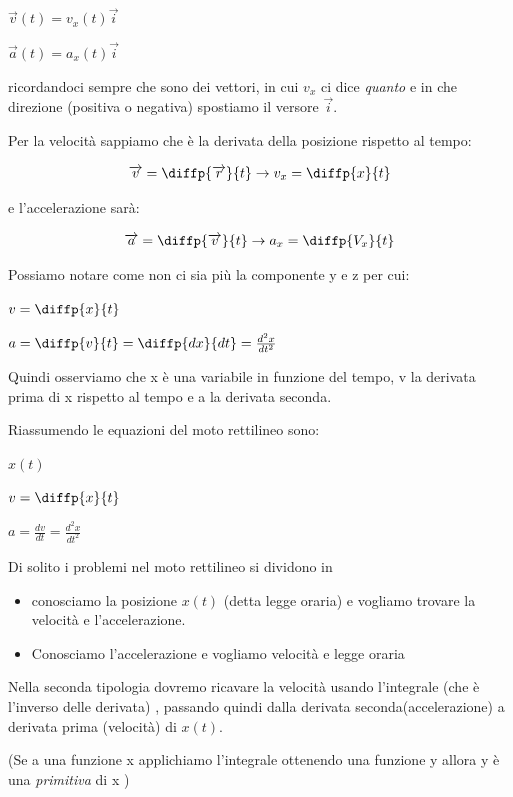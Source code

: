 $\overrightarrow{v}(t)=v_{x}(t)\overrightarrow{i}$ 

$\overrightarrow{a}(t)=a_{x}(t)\overrightarrow{i}$ 

ricordandoci sempre che sono dei vettori, 
in cui $v_x$ ci dice \textit{quanto} e in che direzione
(positiva o negativa) spostiamo 
il versore $\overrightarrow{i}$.

Per la velocità sappiamo che è la derivata della posizione rispetto
al tempo:

\begin{equation}
\overrightarrow{v}=\diffp{\overrightarrow{r}}{t} \rightarrow v_x=\diffp{x}{t}
\end{equation}

e l'accelerazione sarà:

\begin{equation}
    \overrightarrow{a}=\diffp{\overrightarrow{v}}{t} \rightarrow a_x=\diffp{V_x}{t}
\end{equation}

Possiamo notare come non ci sia più la componente y e z per cui:

$v=\diffp{x}{t}$

$a=\diffp{v}{t}=\diffp{dx}{dt}=\frac{d^2x}{dt^2}$

Quindi osserviamo che x è una variabile in funzione del tempo, 
v la derivata prima di x rispetto al tempo e a la derivata seconda.

Riassumendo le equazioni del moto rettilineo sono:

$x(t)$

$v=\diffp{x}{t}$

$a=\frac{dv}{dt}=\frac{d^2x}{d t^2}$

Di solito i problemi nel moto rettilineo si dividono in 

\begin{itemize}
\item conosciamo la posizione
$x(t)$ (detta legge oraria) e vogliamo trovare la velocità e l'accelerazione.

\item Conosciamo l'accelerazione e vogliamo velocità e legge oraria
\end{itemize}

Nella seconda tipologia dovremo ricavare la velocità usando l'integrale
(che è l'inverso delle derivata) , passando quindi dalla derivata seconda(accelerazione)
a derivata prima (velocità) di $x(t)$.

(Se a una funzione x applichiamo l'integrale ottenendo
una funzione y 
allora y è una \textit{primitiva} di x )


